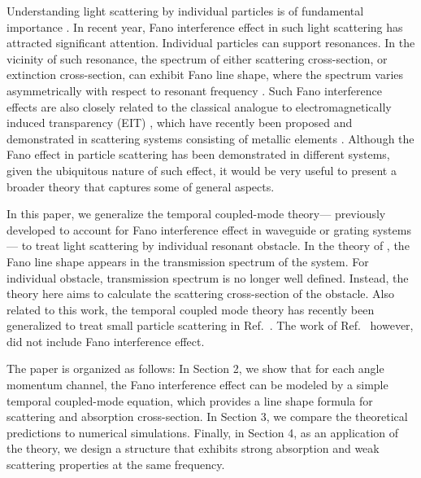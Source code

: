 \documentclass[preprint,aps]{revtex4}
\begin{document}
Understanding light scattering by individual particles is of
fundamental importance \cite{bohren1983absorption}. In recent year,
Fano interference effect \cite{fano1961effects} in such light
scattering has attracted significant attention. Individual particles
can support resonances. In the vicinity of such resonance, the
spectrum of either scattering cross-section, or  extinction
cross-section, can exhibit Fano line shape, where the spectrum
varies asymmetrically with respect to resonant frequency
\cite{tribelsky2008light,fedotov2007sharp,luk2007peculiarities,christ2008symmetry,liu2008magnetoinductive,hao2008symmetry}.
Such Fano interference effects are also closely related to the
classical analogue to electromagnetically induced transparency (EIT)
\cite{harris1997EIT}, which have recently been proposed and
demonstrated in scattering systems consisting of metallic elements
\cite{zhang2008plasmon,tassin2009low,yannopapas2009electromagnetically,tassin2009planar,papasimakis2008metamaterial,papasimakis2009metamaterial,liu2009plasmonic}.
Although the Fano effect in particle scattering has been
demonstrated in different systems, given the ubiquitous nature of
such effect, it would be very useful to present a broader theory
that captures some of general aspects.

In this paper, we generalize the temporal coupled-mode theory---
previously developed to account for Fano interference effect in
waveguide or grating systems \cite{fan2003temporal}--- to treat
light scattering by individual resonant obstacle. In the theory of
\cite{fan2003temporal}, the Fano line shape appears in the
transmission spectrum of the system. For individual obstacle,
transmission spectrum is no longer well defined. Instead, the theory
here aims to calculate the scattering cross-section of the obstacle.
Also related to this work, the temporal coupled mode theory has
recently been generalized to treat small particle scattering in
Ref.~\cite{hamam2007coupled}. The work of
Ref.~\cite{hamam2007coupled} however, did not include Fano
interference effect.



The paper is organized as follows: In Section 2, we show that for
each angle momentum channel, the Fano interference effect can be
modeled by a simple temporal coupled-mode equation, which provides a
line shape formula for scattering  and absorption cross-section. In
Section 3, we compare the theoretical predictions to numerical
simulations. Finally, in Section 4, as an application of the theory,
we design a structure that exhibits strong absorption and weak
scattering properties at the same frequency.
\end{document}
